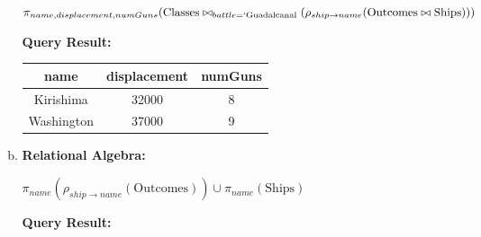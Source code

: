\documentclass[12pt]{article}
\begin{document}
\begin{enumerate}
\begin{enumerate}[a)]
        \bigskip

        $\pi_{name,displacement,numGuns}(\text{Classes} \bowtie_{battle=`\text{Guadalcanal}} (\rho_{ship \to name} (\text{Outcomes} \bowtie \text{Ships})))$

        \bigskip

        \textbf{Query Result:}

        \bigskip

        \begin{tabular}{|c|c|c|}
            \hline
            name    &   displacement    &   numGuns\\
            \hline
            Kirishima   &   32000   &   8\\
            \hline
            Washington   &   37000   &   9\\
            \hline
        \end{tabular}

        \bigskip

        \item

        \textbf{Relational Algebra:}

        \bigskip

        $\pi_{name}(\rho_{ship \to name}(\text{Outcomes})) \cup \pi_{name}(\text{Ships})$

        \bigskip

        \textbf{Query Result:}

        \bigskip


\end{enumerate}
\end{enumerate}
\end{document}
